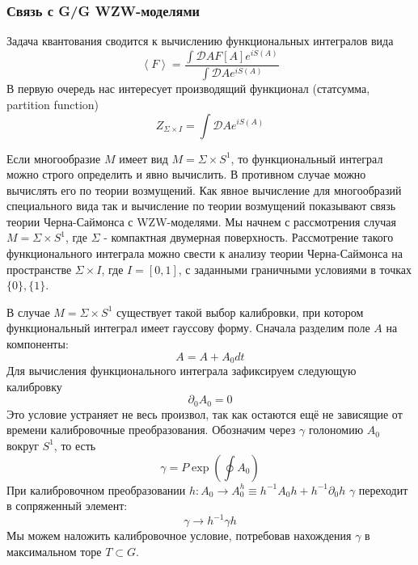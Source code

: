 \documentclass[a4paper,12pt]{article}
\theoremstyle{definition} \newtheorem{Def}{Definition}
\begin{document}
\subsubsection{Связь с G/G WZW-моделями}
\label{sec:gg-wzw}

Задача квантования сводится к вычислению функциональных интегралов вида
\begin{equation}
  \label{eq:9}
  \left< F \right> = \frac{\int \mathcal{D} A F[A] e^{i S(A)}}{\int \mathcal{D} A e^{iS(A)}}
\end{equation}
В первую очередь нас интересует производящий функционал (статсумма, partition function)
\begin{equation}
  \label{eq:14}
  Z_{\Sigma\times I}=\int \mathcal{D} A e^{iS(A)}
\end{equation}

Если многообразие $M$ имеет вид $M=\Sigma\times S^1$, то функциональный интеграл можно строго определить и явно вычислить. В противном случае можно вычислять его по теории возмущений. Как явное вычисление для многообразий специального вида так и вычисление по теории возмущений показывают связь теории Черна-Саймонса с WZW-моделями. Мы начнем с рассмотрения случая $M=\Sigma\times S^1$, где $\Sigma$ - компактная двумерная поверхность. Рассмотрение такого функционального интеграла можно свести к анализу теории Черна-Саймонса на пространстве $\Sigma\times I$, где $I=[0,1]$, с заданными граничными условиями в точках $\{0\}, \{1\}$.

В случае $M=\Sigma\times S^1$ существует такой выбор калибровки, при котором функциональный интеграл имеет гауссову форму. 
Сначала разделим поле $A$ на компоненты:
\begin{equation}
  \label{eq:10}
  A=A+A_0 dt
\end{equation}
Для вычисления функционального интеграла зафиксируем следующую калибровку
\begin{equation}
  \label{eq:11}
  \partial_0 A_0 =0
\end{equation}
Это условие устраняет не весь произвол, так как остаются ещё не зависящие от времени калибровочные преобразования. Обозначим через $\gamma$ голономию $A_0$ вокруг $S^1$, то есть
\begin{equation}
  \label{eq:12}
  \gamma=P \exp\left(\oint A_0\right)
\end{equation}
При калибровочном преобразовании $h: A_0\to A_0^h\equiv h^{-1} A_0 h+h^{-1}\partial_0 h$ $\gamma$ переходит в сопряженный элемент:
\begin{equation}
  \label{eq:13}
  \gamma\to h^{-1} \gamma h
\end{equation}
Мы можем наложить калибровочное условие, потребовав нахождения $\gamma$ в максимальном торе $T\subset G$.
\end{document}
